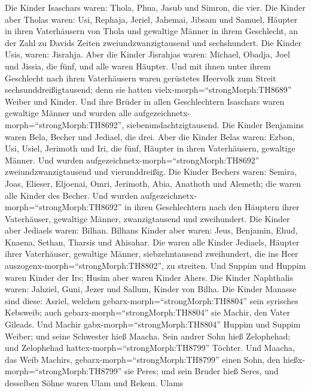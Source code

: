  Die Kinder Isaschars waren: Thola, Phua, Jasub und Simron,
die vier.  Die Kinder aber Tholas waren: Usi, Rephaja,
Jeriel, Jahemai, Jibsam und Samuel, Häupter in ihren Vaterhäusern von
Thola und gewaltige Männer in ihrem Geschlecht, an der Zahl zu Davids
Zeiten zweiundzwanzigtausend und sechshundert.  Die Kinder
Usis, waren: Jisrahja. Aber die Kinder Jisrahjas waren: Michael, Obadja,
Joel und Jissia, die fünf, und alle waren Häupter.  Und mit
ihnen unter ihrem Geschlecht nach ihren Vaterhäusern waren gerüstetes
Heervolk zum Streit sechsunddreißigtausend; denn sie hatten
vielx-morph=``strongMorph:TH8689'' Weiber und Kinder.  Und
ihre Brüder in allen Geschlechtern Isaschars waren gewaltige Männer und
wurden alle aufgezeichnetx-morph=``strongMorph:TH8692'',
siebenundachtzigtausend.  Die Kinder Benjamins waren Bela,
Becher und Jediael, die drei.  Aber die Kinder Belas waren:
Ezbon, Usi, Usiel, Jerimoth und Iri, die fünf, Häupter in ihren
Vaterhäusern, gewaltige Männer. Und wurden
aufgezeichnetx-morph=``strongMorph:TH8692'' zweiundzwanzigtausend und
vierunddreißig.  Die Kinder Bechers waren: Semira, Joas,
Elieser, Eljoenai, Omri, Jerimoth, Abia, Anathoth und Alemeth; die waren
alle Kinder des Becher.  Und wurden
aufgezeichnetx-morph=``strongMorph:TH8692'' in ihren Geschlechtern nach
den Häuptern ihrer Vaterhäuser, gewaltige Männer, zwanzigtausend und
zweihundert.  Die Kinder aber Jediaels waren: Bilhan.
Bilhans Kinder aber waren: Jeus, Benjamin, Ehud, Knaena, Sethan, Tharsis
und Ahisahar.  Die waren alle Kinder Jediaels, Häupter
ihrer Vaterhäuser, gewaltige Männer, siebzehntausend zweihundert, die
ins Heer auszogenx-morph=``strongMorph:TH8802'', zu streiten.
 Und Suppim und Huppim waren Kinder der Irs; Husim aber
waren Kinder Ahers.  Die Kinder Naphthalis waren: Jahziel,
Guni, Jezer und Sallum, Kinder von Bilha.  Die Kinder
Manasse sind diese: Asriel, welchen gebarx-morph=``strongMorph:TH8804''
sein syrisches Kebsweib; auch gebarx-morph=``strongMorph:TH8804'' sie
Machir, den Vater Gileads.  Und Machir
gabx-morph=``strongMorph:TH8804'' Huppim und Suppim Weiber; und seine
Schwester hieß Maacha. Sein andrer Sohn hieß Zelophehad; und Zelophehad
hattex-morph=``strongMorph:TH8799'' Töchter.  Und Maacha,
das Weib Machirs, gebarx-morph=``strongMorph:TH8799'' einen Sohn, den
hießx-morph=``strongMorph:TH8799'' sie Peres; und sein Bruder hieß
Seres, und desselben Söhne waren Ulam und Rekem.  Ulams
